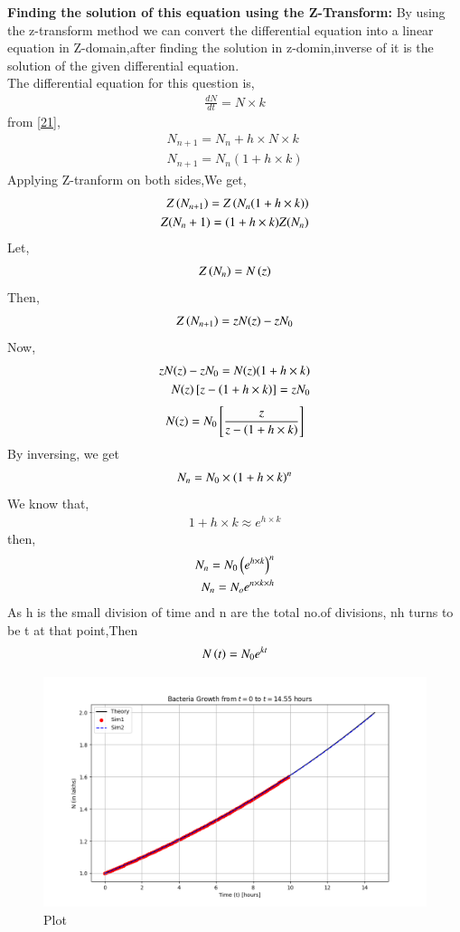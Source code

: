\documentclass[journal]{IEEEtran}
\begin{document}
\textbf{Finding the solution of this equation using the Z-Transform:} By using the z-transform method we can convert the differential equation into a linear equation in Z-domain,after finding the solution in z-domin,inverse of it is the solution of the given differential equation. \\
The differential equation for this question is,
\begin{align}
\frac{dN}{dt}=N \times k
\end{align}
from \eqref{21}, \\
\begin{align}
N_{n+1}=N_{n}+h \times N \times k \\
N_{n+1}=N_{n}(1+h \times k)
\end{align}
Applying Z-tranform on both sides,We get,
\begin{align}
Z\left(N_{n+1}\right)=Z\left(N_{n}(1+h \times k)\right) \\
Z(N_n+1)=(1+h\times k)Z(N_n)
\end{align}
Let,
\begin{align}
Z\left(N_n\right)=N\left(z\right)
\end{align}
Then,
\begin{align}
Z\left(N_{n+1}\right)=zN(z)-zN_0
\end{align}
Now,
\begin{align}
zN(z)-zN_0 = N(z)(1+h\times k) \\
N(z) {}\left[z-\left(1+h \times k\right)\right] = zN_0 \\
\end{align}
\begin{align}
N(z) = N_0 {}\left[\frac{z}{z-\left(1+h \times k\right)}\right]
\end{align}
By inversing, we get 
\begin{align}
N_n = N_0 \times \left(1+h \times k\right)^n
\end{align}
We know that,
\begin{align}
1+h \times k \approx e^{h \times k}
\end{align}
then,
\begin{align}
N_n = N_0 \left(e^{h\times k}\right)^n \\
N_n = N_o e^{n\times k \times h}
\end{align}
As h is the small division of time and n are the total no.of divisions, nh turns to be t at that point,Then
\begin{align}
N\left(t\right)=N_0e^{kt}
\end{align}
\begin{figure}[htbp] %
    \centering
    \includegraphics[width=\textwidth]{figs/plot.png} %
    \caption{Plot}
\end{figure}
\end{document}
